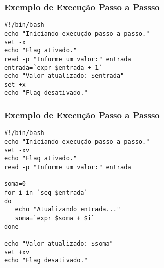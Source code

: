 \documentclass{beamer}
\begin{document}
   \begin{frame}[fragile]
      \frametitle{Exemplo de Execução Passo a Passso}
      \begin{verbatim}
#!/bin/bash
echo "Iniciando execução passo a passo."
set -x
echo "Flag ativado."
read -p "Informe um valor:" entrada
entrada=`expr $entrada + 1`
echo "Valor atualizado: $entrada"
set +x
echo "Flag desativado."
      \end{verbatim}
\end{frame}

   \begin{frame}[fragile]
      \frametitle{Exemplo de Execução Passo a Passso}
      \begin{verbatim}
#!/bin/bash
echo "Iniciando execução passo a passo."
set -xv
echo "Flag ativado."
read -p "Informe um valor:" entrada

soma=0
for i in `seq $entrada`
do
   echo "Atualizando entrada..."
   soma=`expr $soma + $i`
done

echo "Valor atualizado: $soma"
set +xv
echo "Flag desativado."
      \end{verbatim}
\end{frame}
\end{document}
